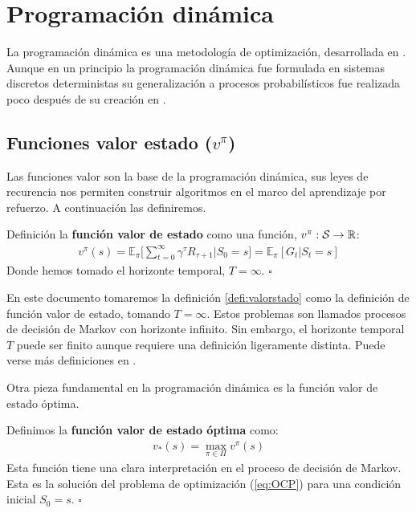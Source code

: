 \section{Programación dinámica}

La programación dinámica es una metodología de optimización, desarrollada en \cite{bellman1954theory}. Aunque en un principio la programación dinámica fue formulada en sistemas discretos deterministas su generalización a procesos probabilísticos fue realizada poco después de su creación en \cite{bellman1957theory}. 


\subsection{Funciones valor estado ($v^\pi$)}

Las funciones valor son la base de la programación dinámica, sus leyes de recurencia nos permiten construir algoritmos en el marco del aprendizaje por refuerzo. A continuación las definiremos.

\begin{defi}\label{defi:valorstado}
    Definición la \textbf{función valor de estado} como una función, $v^\pi:\mathcal{S} \rightarrow \mathbb{R}$:
    \begin{gather}
        v^\pi(s) = \mathbb{E}_\pi\big[\sum_{t=0}^\infty \gamma^\tau R_{{\tau+1}}|S_0=s\big]=\mathbb{E}_\pi[G_t|S_t = s]
    \end{gather}
    Donde hemos tomado el horizonte temporal, $T=\infty$.
    \hfill\ensuremath{\square}
\end{defi}


\begin{obs}
    En este documento tomaremos la definición \ref{defi:valorstado} como la definición de función valor de estado, tomando $T=\infty$. Estos problemas  son llamados procesos de decisión de Markov con horizonte infinito. Sin embargo, el horizonte temporal $T$ puede ser finito aunque requiere una definición ligeramente distinta. Puede verse más definiciones en \cite{LAZARIC}.
\end{obs}

Otra pieza fundamental en la programación dinámica es la función valor de estado óptima.

\begin{defi}
    Definimos la \textbf{función valor de estado óptima} como:
    \begin{gather}\label{valorestadoopt}
        v_*(s) = \max_{\pi\in \Pi} v^\pi(s)
    \end{gather}
    Esta función tiene  una clara interpretación en el proceso de decisión de Markov. Esta es la solución del problema de optimización (\ref{eq:OCP}) para una condición inicial $S_0=s$.
    \hfill\ensuremath{\square}
\end{defi}

